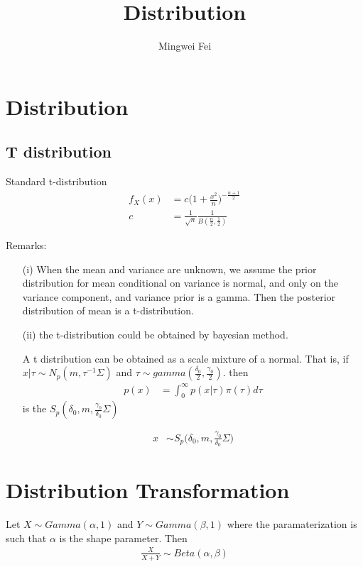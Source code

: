 \documentclass[11pt]{article} %
\title{Distribution}
\author{Mingwei Fei}
\begin{document}
\maketitle

\section{Distribution}

\subsection{T distribution}
Standard t-distribution
\begin{align*}
	f_X(x) &= c \Big( 1 + \frac{x^2}{n} \Big)^{-\frac{n+1}{2}} \\
	c &= \frac{1}{\sqrt{n}} \frac{1}{B(\frac{n}{2}, \frac{1}{2})}
\end{align*}



Remarks: 

\begin{itemize}
\item[(i)] When the mean and variance are unknown, we assume the prior distribution for mean conditional on variance is normal, and only on the variance component, and variance prior is a gamma. Then the posterior distribution of mean is a t-distribution.

\item[(ii)] the t-distribution could be obtained by bayesian method. 

A t distribution can be obtained as a scale mixture of a normal. That is, if $x | \tau \sim N_p(m, \tau^{-1} \Sigma)$ and $\tau \sim gamma (\frac{\delta_0}{2}, \frac{\gamma_0}{2})$.
then 
\begin{align*}
	p(x) &= \int_0^{\infty} p(x | \tau) \pi(\tau) d \tau
\end{align*}
is the $S_p(\delta_0, m, \frac{\gamma_0}{\delta_0} \Sigma)$

\begin{align*}
	x & \sim S_p \Big(\delta_0, m, \frac{\gamma_0}{\delta_0} \Sigma \Big)
\end{align*}

\end{itemize}







\section{Distribution Transformation}
Let $X \sim Gamma(\alpha, 1)$ and $Y \sim Gamma(\beta, 1)$ where the paramaterization is such that $\alpha$ is the shape parameter. Then 
\begin{align*}
	\frac{X}{X+Y} \sim Beta(\alpha, \beta)
\end{align*}
\end{document}
